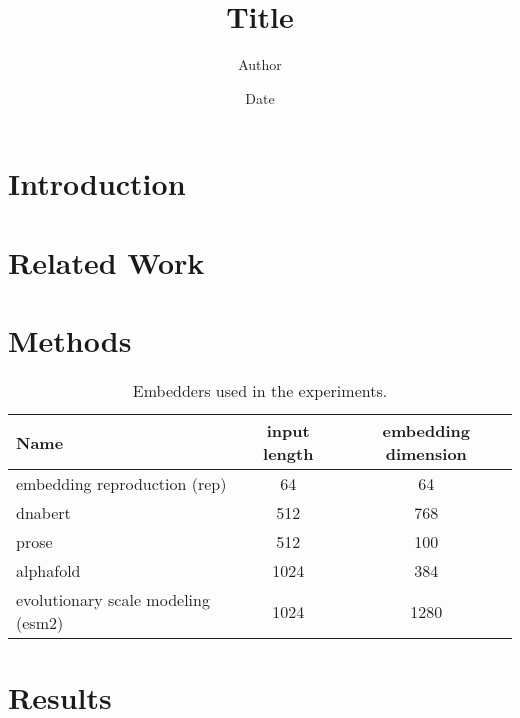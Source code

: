 \documentclass[12pt, letterpaper, twocolumn]{article}
\title{Title}
\author{Author}
\date{Date}
\begin{document}
\maketitle

\section{Introduction}

\section{Related Work}

\section{Methods}


\onecolumn
\begin{table}[h]
\centering
\begin{tabular}{|l c c|} 
    \hline
    Name & input length & embedding dimension  \\ 
    \hline
    embedding reproduction (rep)\cite{yang2018learned}       & 64    & 64    \\
    dnabert \cite{ji2021dnabert}                     & 512     & 768  \\
    prose   \cite{bepler2021learning}                   & 512   & 100    \\
    alphafold  \cite{jumper2021highly}                 & 1024   & 384 \\
    evolutionary scale modeling (esm2) \cite{lin2022language}   & 1024    & 1280 \\  
    \hline
\end{tabular}
\caption{Embedders used in the experiments.}
\label{table:data}
\end{table}
\twocolumn

\section{Results}

\onecolumn
\newpage
\FloatBarrier


\end{document}

